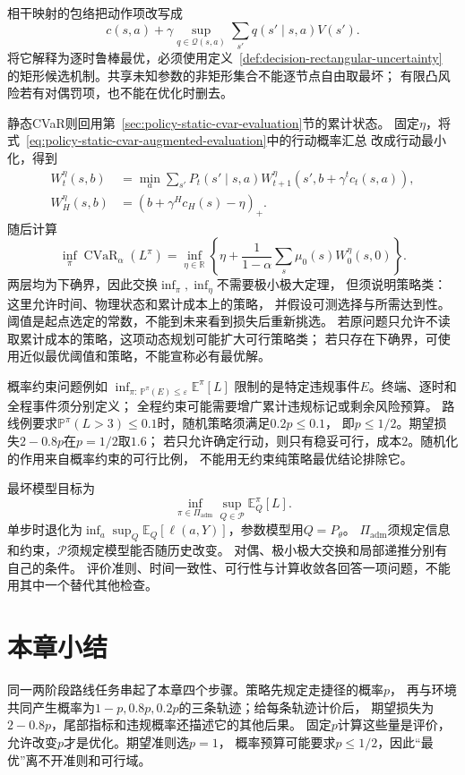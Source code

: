 相干映射的包络把动作项改写成
\[
  c(s,a)+\gamma\sup_{q\in\mathcal Q(s,a)}
    \sum_{s'}q(s'\mid s,a)V(s').
\]
将它解释为逐时鲁棒最优，必须使用定义~\ref{def:decision-rectangular-uncertainty}
的矩形候选机制。共享未知参数的非矩形集合不能逐节点自由取最坏；
有限凸风险若有对偶罚项，也不能在优化时删去。

静态CVaR则回用第~\ref{sec:policy-static-cvar-evaluation}节的累计状态。
固定$\eta$，将式~\eqref{eq:policy-static-cvar-augmented-evaluation}中的行动概率汇总
改成行动最小化，得到
\[
  \begin{aligned}
    W_t^\eta(s,b)&=\min_a\sum_{s'}P_t(s'\mid s,a)
      W_{t+1}^\eta(s',b+\gamma^tc_t(s,a)),\\
    W_H^\eta(s,b)&=(b+\gamma^Hc_H(s)-\eta)_+.
  \end{aligned}
\]
随后计算
\[
  \inf_\pi\operatorname{CVaR}_\alpha(L^\pi)
  =\inf_{\eta\in\mathbb R}
    \left\{\eta+\frac{1}{1-\alpha}
      \sum_s\mu_0(s)W_0^\eta(s,0)\right\}.
\]
两层均为下确界，因此交换$\inf_\pi,\inf_\eta$不需要极小极大定理，
但须说明策略类：这里允许时间、物理状态和累计成本上的策略，
并假设可测选择与所需达到性。阈值是起点选定的常数，不能到未来看到损失后重新挑选。
若原问题只允许不读取累计成本的策略，这项动态规划可能扩大可行策略类；
若只存在下确界，可使用近似最优阈值和策略，不能宣称必有最优解。

概率约束问题例如
$\inf_{\pi:\,\mathbb P^\pi(E)\leq\varepsilon}\mathbb E^\pi[L]$
限制的是特定违规事件$E$。终端、逐时和全程事件须分别定义；
全程约束可能需要增广累计违规标记或剩余风险预算。
路线例要求$\mathbb P^\pi(L>3)\leq0.1$时，随机策略须满足$0.2p\leq0.1$，
即$p\leq1/2$。期望损失$2-0.8p$在$p=1/2$取$1.6$；
若只允许确定行动，则只有稳妥可行，成本$2$。随机化的作用来自概率约束的可行比例，
不能用无约束纯策略最优结论排除它。

最坏模型目标为
\[
  \inf_{\pi\in\Pi_{\mathrm{adm}}}
    \sup_{Q\in\mathcal P}\mathbb E_Q^\pi[L].
\]
单步时退化为$\inf_a\sup_Q\mathbb E_Q[\ell(a,Y)]$，参数模型用$Q=P_\theta$。
$\Pi_{\mathrm{adm}}$须规定信息和约束，$\mathcal P$须规定模型能否随历史改变。
对偶、极小极大交换和局部递推分别有自己的条件。
评价准则、时间一致性、可行性与计算收敛各回答一项问题，不能用其中一个替代其他检查。

\section{本章小结}
\label{sec:decision-theory-and-dynamic-risk-summary}

同一两阶段路线任务串起了本章四个步骤。策略先规定走捷径的概率$p$，
再与环境共同产生概率为$1-p,0.8p,0.2p$的三条轨迹；给每条轨迹计价后，
期望损失为$2-0.8p$，尾部指标和违规概率还描述它的其他后果。
固定$p$计算这些量是评价，允许改变$p$才是优化。期望准则选$p=1$，
概率预算可能要求$p\leq1/2$，因此“最优”离不开准则和可行域。

